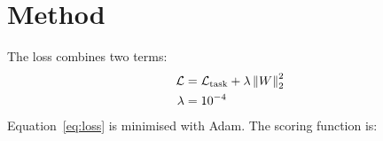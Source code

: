 \section{Method}\label{sec:method}
The loss combines two terms:
\begin{align}
  \mathcal{L} &= \mathcal{L}_{\text{task}} + \lambda \left\lVert W \right\rVert_2^2 \label{eq:loss}\\
  \lambda &= 10^{-4}
\end{align}
Equation~\eqref{eq:loss} is minimised with Adam. The scoring function is:

